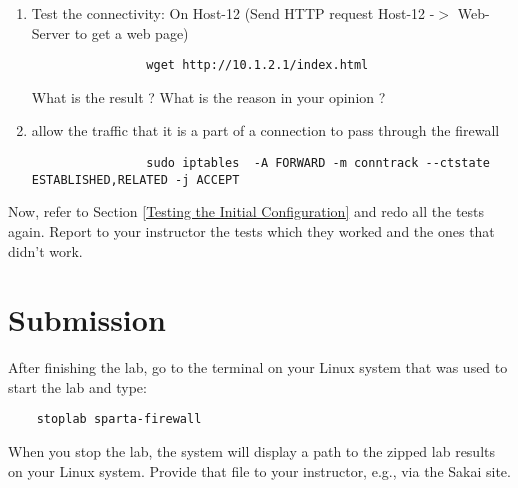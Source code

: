 \begin{enumerate}
			\item Test the connectivity: On Host-12 (Send HTTP request Host-12 -$>$ Web-Server to get a web page)
			\begin{verbatim}
			    wget http://10.1.2.1/index.html
			\end{verbatim}

			What is the result ? What is the reason in your opinion ?

		\item allow the traffic that it is a part of a connection to pass through the firewall
		\begin{verbatim}
				sudo iptables  -A FORWARD -m conntrack --ctstate ESTABLISHED,RELATED -j ACCEPT
		\end{verbatim}
\end{enumerate}

Now, refer to Section \ref{Testing the Initial Configuration} and redo all the tests again. Report to your instructor the tests which they worked and the ones that didn't work.


\section{Submission}
After finishing the lab, go to the terminal on your Linux system that was used to start the lab and type:
\begin{verbatim}
    stoplab sparta-firewall
\end{verbatim}
When you stop the lab, the system will display a path to the zipped lab results on your Linux system.  Provide that file to
your instructor, e.g., via the Sakai site.


